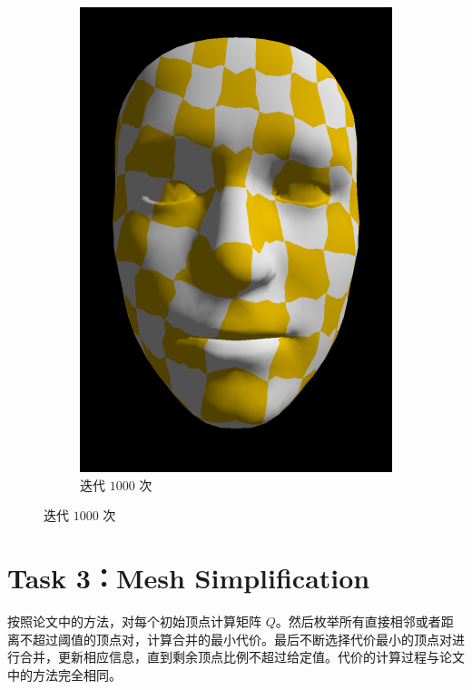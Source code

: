 \documentclass[UTF8]{ctexart}
\begin{document}
\begin{figure}[h]
\begin{subfigure}[b]{0.32\textwidth}
        \includegraphics[height=0.3\textheight]{images/2-3.png}
        \caption{迭代 $1000$ 次}
    \end{subfigure}
\end{figure}

\section*{Task 3：Mesh Simplification}

按照论文中的方法，对每个初始顶点计算矩阵 $Q$。然后枚举所有直接相邻或者距离不超过阈值的顶点对，计算合并的最小代价。最后不断选择代价最小的顶点对进行合并，更新相应信息，直到剩余顶点比例不超过给定值。代价的计算过程与论文中的方法完全相同。
\end{document}
